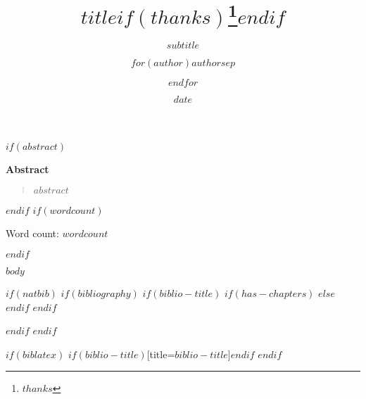 \documentclass[12pt]{article}
\title{$title$$if(thanks)$\thanks{$thanks$}$endif$}
\subtitle{$subtitle$}
\author{$for(author)$$author$$sep$ \and $endfor$}
\date{$date$}
\begin{document}
\begin{titlingpage}
\maketitle
$if(abstract)$
\vspace{\baselineskip}
\begin{center}
\textbf{\sffamily\large Abstract}
\end{center}
\begin{quote}
$abstract$
\end{quote}
$endif$
$if(wordcount)$
\vspace{\baselineskip}
\begin{center}
Word count: $wordcount$
\end{center}
$endif$
\end{titlingpage}

$body$

$if(natbib)$
$if(bibliography)$
$if(biblio-title)$
$if(has-chapters)$
\renewcommand\bibname{$biblio-title$}
$else$
\renewcommand\refname{$biblio-title$}
$endif$
$endif$

$endif$
$endif$

$if(biblatex)$
\printbibliography$if(biblio-title)$[title=$biblio-title$]$endif$
$endif$
\end{document}
